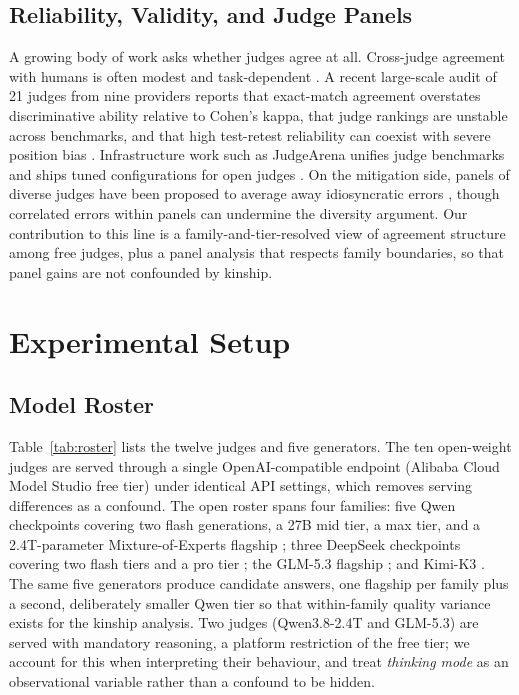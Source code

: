 \documentclass[review,12pt]{elsarticle}
\begin{document}
\subsection{Reliability, Validity, and Judge Panels}
A growing body of work asks whether judges agree at all. Cross-judge
agreement with humans is often modest and task-dependent
\citep{hosking2023human,bavaresco2024llms}. A recent large-scale audit of 21
judges from nine providers reports that exact-match agreement overstates
discriminative ability relative to Cohen's kappa, that judge rankings are
unstable across benchmarks, and that high test-retest reliability can coexist
with severe position bias \citep{norman2026reliability}. Infrastructure work
such as JudgeArena unifies judge benchmarks and ships tuned configurations
for open judges \citep{lushtaku2026judgearena}. On the mitigation side,
panels of diverse judges have been proposed to average away idiosyncratic
errors \citep{verga2024replacing}, though correlated errors within panels can
undermine the diversity argument. Our contribution to this line is a
family-and-tier-resolved view of agreement structure among free judges, plus
a panel analysis that respects family boundaries, so that panel gains are not
confounded by kinship.

\section{Experimental Setup}
\label{sec:setup}

\subsection{Model Roster}
\label{sec:roster}

Table~\ref{tab:roster} lists the twelve judges and five generators. The ten
open-weight judges are served through a single OpenAI-compatible endpoint
(Alibaba Cloud Model Studio free tier) under identical API settings, which
removes serving differences as a confound. The open roster spans four
families: five Qwen checkpoints covering two flash generations, a 27B mid
tier, a max tier, and a 2.4T-parameter Mixture-of-Experts flagship
\citep{qwen2025qwen3}; three DeepSeek checkpoints covering two flash tiers
and a pro tier \citep{deepseek2024v3}; the GLM-5.3 flagship \citep{glm2024chatglm};
and Kimi-K3 \citep{kimi2025k2}. The same five
generators produce candidate answers, one flagship per family plus a second,
deliberately smaller Qwen tier so that within-family quality variance exists
for the kinship analysis. Two judges (Qwen3.8-2.4T and GLM-5.3)
are served with mandatory reasoning, a platform restriction of the free tier;
we account for this when interpreting their behaviour, and treat
\emph{thinking mode} as an observational variable rather than a confound to
be hidden.
\end{document}
